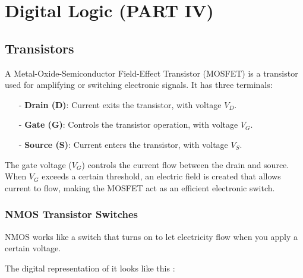 \documentclass[12pt,openany]{book}
\begin{document}
			      	\chapter{Digital Logic (PART IV)}
			      	
				
			      	\section{Transistors}
			      	A Metal-Oxide-Semiconductor Field-Effect Transistor (MOSFET) is a transistor used for amplifying or switching electronic signals. It has three terminals:
			      	
			      	\begin{itemize}
			      		\item[-] \textbf{Drain (D)}: Current exits the transistor, with voltage \( V_D\).
			      		\item[-] \textbf{Gate (G)}: Controls the transistor operation, with voltage \( V_G\).
			      		\item[-] \textbf{Source (S)}: Current enters the transistor, with voltage \( V_S\).
			      	\end{itemize}
			      	
			      	
			      	
			      	The gate voltage (\( V_G \)) controls the current flow between the drain and source. When \( V_G \) exceeds a certain threshold, an electric field is created that allows current to flow, making the MOSFET act as an efficient electronic switch.
			      \vspace*{20px}
					\subsection{NMOS Transistor Switches}
			      	\small NMOS works like a switch that turns on to let electricity flow when you apply a certain voltage.
			      	
			      	The digital representation of it looks like this :
			      	
\end{document}
